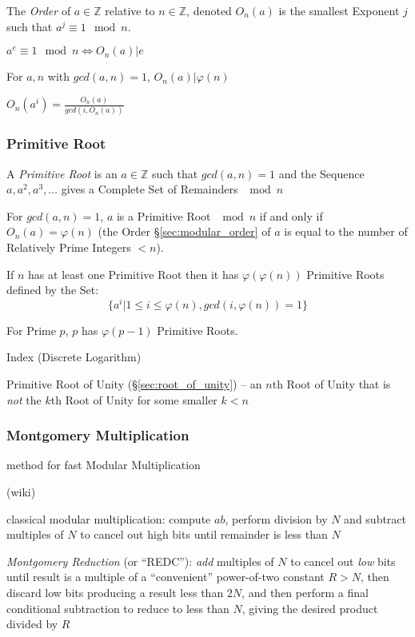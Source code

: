 The \emph{Order} of $a \in \mathbb{Z}$ relative to $n \in \mathbb{Z}$,
denoted $O_n(a)$ is the smallest Exponent $j$ such that $a^j \equiv 1
\mod n$.

$a^e \equiv 1 \mod n \Leftrightarrow O_n(a) | e$

For $a, n$ with $gcd(a,n) = 1$, $O_n(a) | \varphi(n)$

$O_n(a^i) = \frac{O_n(a)}{gcd(i,O_n(a))}$



\subsubsection{Primitive Root}\label{sec:primitive_root}

A \emph{Primitive Root} is an $a \in \mathbb{Z}$ such that $gcd(a,n) =
1$ and the Sequence $a, a^2, a^3, \ldots$ gives a Complete Set of
Remainders $\mod n$

For $gcd(a,n) = 1$, $a$ is a Primitive Root $\mod n$ if and only if
$O_n(a) = \varphi(n)$ (the Order \S\ref{sec:modular_order} of $a$ is
equal to the number of Relatively Prime Integers $< n$).

If $n$ has at least one Primitive Root then it has
$\varphi(\varphi(n))$ Primitive Roots defined by the Set:
\[
  \{ a^i | 1 \leq i \leq \varphi(n), gcd(i,\varphi(n)) = 1 \}
\]

For Prime $p$, $p$ has $\varphi(p-1)$ Primitive Roots.

Index (Discrete Logarithm) %

\fist Primitive Root of Unity (\S\ref{sec:root_of_unity}) -- an $n$th Root of
Unity that is \emph{not} the $k$th Root of Unity for some smaller $k < n$



\subsubsection{Montgomery Multiplication}\label{sec:montgomery_multiplication}

method for fast Modular Multiplication

(wiki)

classical modular multiplication: compute $ab$, perform division by $N$ and
subtract multiples of $N$ to cancel out high bits until remainder is less than
$N$

\emph{Montgomery Reduction} (or ``REDC''): \emph{add} multiples of $N$ to cancel
out \emph{low} bits until result is a multiple of a ``convenient'' power-of-two
constant $R > N$, then discard low bits producing a result less than $2N$, and
then perform a final conditional subtraction to reduce to less than $N$, giving
the desired product divided by $R$

